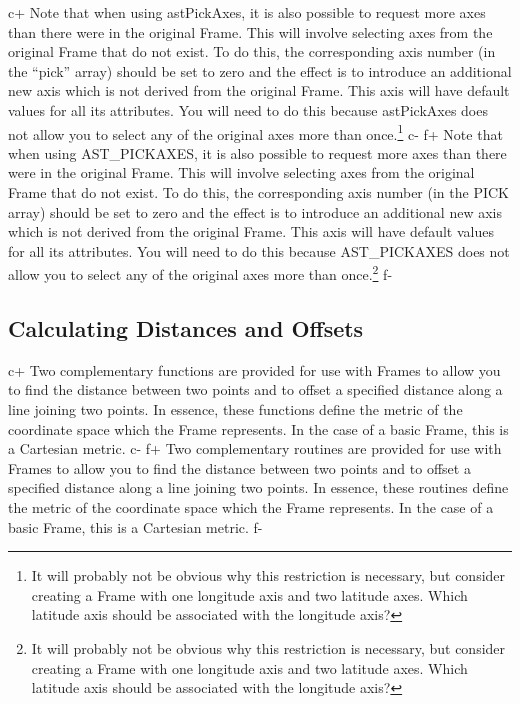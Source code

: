 \documentclass[twoside,11pt]{article}
\begin{document}
c+
Note that when using astPickAxes, it is also possible to request more
axes than there were in the original Frame. This will involve
selecting axes from the original Frame that do not exist. To do this,
the corresponding axis number (in the ``pick'' array) should be set to
zero and the effect is to introduce an additional new axis which is
not derived from the original Frame. This axis will have default
values for all its attributes. You will need to do this because
astPickAxes does not allow you to select any of the original axes more
than once.\footnote{It will probably not be obvious why this
restriction is necessary, but consider creating a Frame with one
longitude axis and two latitude axes. Which latitude axis should be
associated with the longitude axis?}
c-
f+
Note that when using AST\_PICKAXES, it is also possible to request
more axes than there were in the original Frame. This will involve
selecting axes from the original Frame that do not exist. To do this,
the corresponding axis number (in the PICK array) should be set to
zero and the effect is to introduce an additional new axis which is
not derived from the original Frame. This axis will have default
values for all its attributes. You will need to do this because
AST\_PICKAXES does not allow you to select any of the original axes
more than once.\footnote{It will probably not be obvious why this
restriction is necessary, but consider creating a Frame with one
longitude axis and two latitude axes. Which latitude axis should be
associated with the longitude axis?}
f-

\subsection{\label{ss:distanceandoffset}Calculating Distances and Offsets}

c+
Two complementary functions are provided for use with Frames to allow
you to find the distance between two points and to offset a specified
distance along a line joining two points. In essence, these functions
define the metric of the coordinate space which the Frame
represents. In the case of a basic Frame, this is a Cartesian metric.
c-
f+
Two complementary routines are provided for use with Frames to allow
you to find the distance between two points and to offset a specified
distance along a line joining two points.  In essence, these routines
define the metric of the coordinate space which the Frame
represents. In the case of a basic Frame, this is a Cartesian metric.
f-
\end{document}
